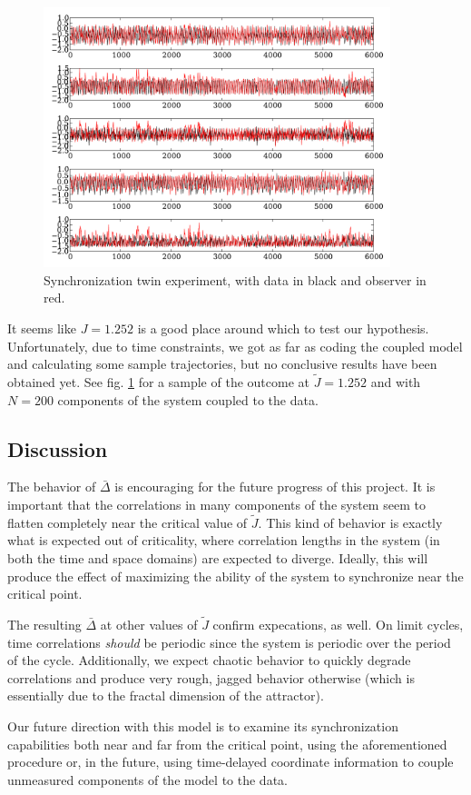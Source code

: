 \documentclass{article} %
\begin{document}
\begin{figure}[p]
	\centering
	\includegraphics[width=0.9\textwidth]{paul_figs/sync_J_1_252_g_0_3}
	\caption{Synchronization twin experiment, with data in black and observer in red.}
	\label{fig:twinex}
\end{figure}

It seems like $J=1.252$ is a good place around which to test our hypothesis.  Unfortunately, due to time constraints, we got as far as coding the coupled model and calculating some sample trajectories, but no conclusive results have been obtained yet. See fig. \ref{fig:twinex} for a sample of the outcome at $\tilde{J}=1.252$ and with $N=200$ components of the system coupled to the data.

\subsection{Discussion}
The behavior of $\bar{\Delta}$ is encouraging for the future progress of this project.  It is important that the correlations in many components of the system seem to flatten completely near the critical value of $\tilde{J}$.  This kind of behavior is exactly what is expected out of criticality, where correlation lengths in the system (in both the time and space domains) are expected to diverge.  Ideally, this will produce the effect of maximizing the ability of the system to synchronize near the critical point.

The resulting $\bar{\Delta}$ at other values of $\tilde{J}$ confirm expecations, as well.  On limit cycles, time correlations \emph{should} be periodic since the system is periodic over the period of the cycle.  Additionally, we expect chaotic behavior to quickly degrade correlations and produce very rough, jagged behavior otherwise (which is essentially due to the fractal dimension of the attractor).

Our future direction with this model is to examine its synchronization capabilities both near and far from the critical point, using the aforementioned procedure or, in the future, using time-delayed coordinate information to couple unmeasured components of the model to the data.




\end{document}
